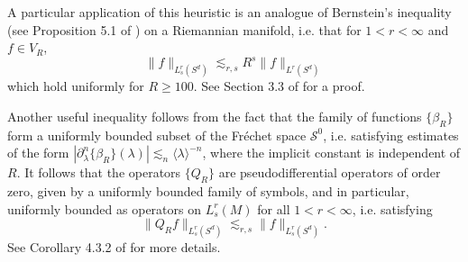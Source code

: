 \begin{remarks}
\begin{enumerate}
    A particular application of this heuristic is an analogue of Bernstein's inequality (see Proposition 5.1 of \cite{Wolff}) on a Riemannian manifold, i.e. that for $1 < r < \infty$ and $f \in V_R$,
    \begin{equation} \label{ManifoldBernsteinInequality}
        \| f \|_{L^r_s(S^d)} \lesssim_{r,s} R^s \| f \|_{L^r(S^d)}
    \end{equation}
    which hold uniformly for $R \geq 100$. See Section 3.3 of \cite{Sogge} for a proof.

    Another useful inequality follows from the fact that the family of functions $\{ \beta_R \}$ form a uniformly bounded subset of the Fr\'{e}chet space $\mathcal{S}^0$, i.e. satisfying estimates of the form $|\partial_\lambda^n \{ \beta_R \}(\lambda)| \lesssim_n \langle \lambda \rangle^{-n}$, where the implicit constant is independent of $R$. It follows that the operators $\{ Q_R \}$ are pseudodifferential operators of order zero, given by a uniformly bounded family of symbols, and in particular, uniformly bounded as operators on $L^r_s(M)$ for all $1 < r < \infty$, i.e. satisfying
    \begin{equation}
        \| Q_R f \|_{L^r_s(S^d)} \lesssim_{r,s} \| f \|_{L^r_s(S^d)}.
    \end{equation}
    See Corollary 4.3.2 of \cite{Sogge} for more details.
\end{enumerate}
\end{remarks}

\begin{comment}

Our remarks reduce Theorem \ref{MainSphereTheorem} to the following statement.

\begin{theorem} \label{RestrictedMainSphereTheorem}
    Suppose $1 \leq p < 2d/(d+1)$. If $R \geq 100$, then for $f \in V_R$,
    \[ \| M_R f \|_{L^p(S^d)} \lesssim C_p(h) \| f \|_{L^p(S^d)}, \]
    where the implicit constant is uniform in $f$, $h$, and $R$.
\end{theorem}

\begin{proof}[Proof that Theorem \ref{RestrictedMainSphereTheorem} implies Theorem \ref{MainSphereTheorem}]
    Remark 2 shows that the analysis of $\{ M_R \}$ for $R \leq 100$ is trivial. For any $f \in L^p(S^d)$, $Q_R f \in V_R$, we conclude from Remark 3 that
    \[ \| M_R f \|_{L^p(S^d)} = \| M_R (Q_R f) \|_{L^p(S^d)} \lesssim C_p(h) \| Q_R f \|_{L^p(S^d)} \lesssim C_p(h) \| f \|_{L^p(S^d)}. \]
    We have thus obtained the required bound for general inputs.
\end{proof}

\end{comment}


